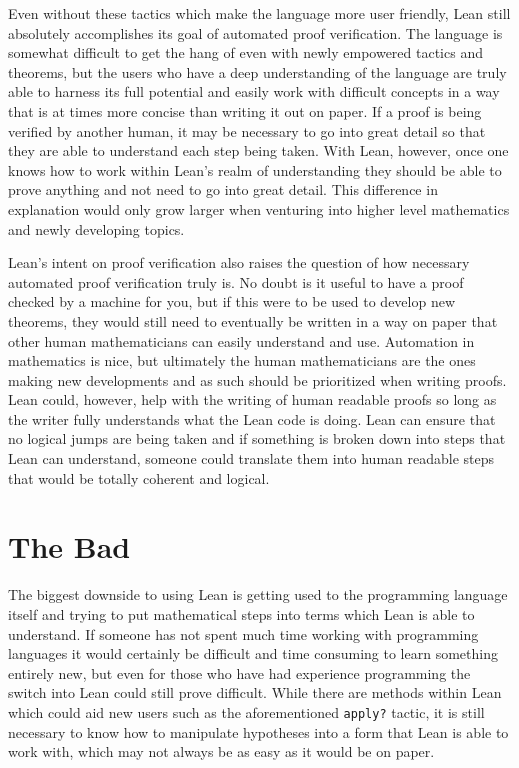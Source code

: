 \documentclass[
  letterpaper,
]{scrreprt}
\theoremstyle{remark}
\begin{document}
Even without these tactics which make the language more user friendly,
Lean still absolutely accomplishes its goal of automated proof
verification. The language is somewhat difficult to get the hang of even
with newly empowered tactics and theorems, but the users who have a deep
understanding of the language are truly able to harness its full
potential and easily work with difficult concepts in a way that is at
times more concise than writing it out on paper. If a proof is being
verified by another human, it may be necessary to go into great detail
so that they are able to understand each step being taken. With Lean,
however, once one knows how to work within Lean's realm of understanding
they should be able to prove anything and not need to go into great
detail. This difference in explanation would only grow larger when
venturing into higher level mathematics and newly developing topics.

Lean's intent on proof verification also raises the question of how
necessary automated proof verification truly is. No doubt is it useful
to have a proof checked by a machine for you, but if this were to be
used to develop new theorems, they would still need to eventually be
written in a way on paper that other human mathematicians can easily
understand and use. Automation in mathematics is nice, but ultimately
the human mathematicians are the ones making new developments and as
such should be prioritized when writing proofs. Lean could, however,
help with the writing of human readable proofs so long as the writer
fully understands what the Lean code is doing. Lean can ensure that no
logical jumps are being taken and if something is broken down into steps
that Lean can understand, someone could translate them into human
readable steps that would be totally coherent and logical.

\hypertarget{the-bad}{%
\section{The Bad}\label{the-bad}}

The biggest downside to using Lean is getting used to the programming
language itself and trying to put mathematical steps into terms which
Lean is able to understand. If someone has not spent much time working
with programming languages it would certainly be difficult and time
consuming to learn something entirely new, but even for those who have
had experience programming the switch into Lean could still prove
difficult. While there are methods within Lean which could aid new users
such as the aforementioned \texttt{apply?} tactic, it is still necessary
to know how to manipulate hypotheses into a form that Lean is able to
work with, which may not always be as easy as it would be on paper.
\end{document}

